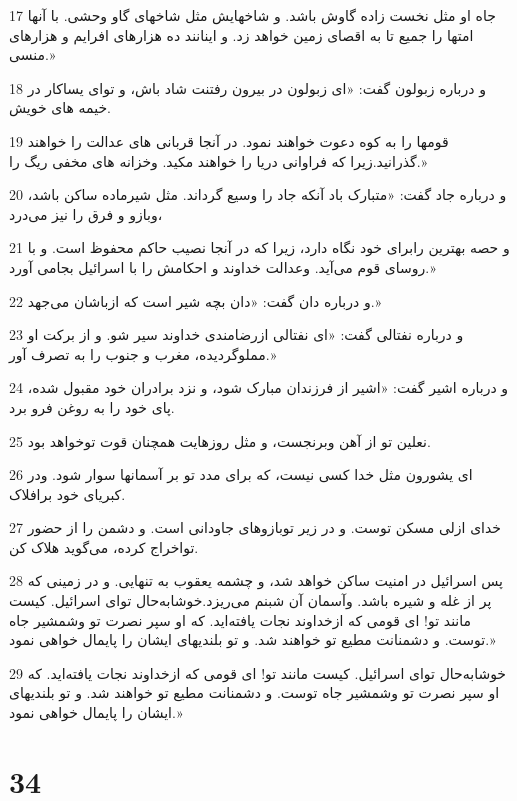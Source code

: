 \par 17 جاه او مثل نخست زاده گاوش باشد. و شاخهایش مثل شاخهای گاو وحشی. با آنها امتها را جمیع تا به اقصای زمین خواهد زد. و اینانند ده هزارهای افرایم و هزارهای منسی.»
\par 18 و درباره زبولون گفت: «ای زبولون در بیرون رفتنت شاد باش، و تو‌ای یساکار در خیمه های خویش.
\par 19 قومها را به کوه دعوت خواهند نمود. در آنجا قربانی های عدالت را خواهند گذرانید.زیرا که فراوانی دریا را خواهند مکید. وخزانه های مخفی ریگ را.»
\par 20 و درباره جاد گفت: «متبارک باد آنکه جاد را وسیع گرداند. مثل شیرماده ساکن باشد، وبازو و فرق را نیز می‌درد، 
\par 21 و حصه بهترین رابرای خود نگاه دارد، زیرا که در آنجا نصیب حاکم محفوظ است. و با روسای قوم می‌آید. وعدالت خداوند و احکامش را با اسرائیل بجامی آورد.»
\par 22 و درباره دان گفت: «دان بچه شیر است که ازباشان می‌جهد.»
\par 23 و درباره نفتالی گفت: «ای نفتالی ازرضامندی خداوند سیر شو. و از برکت او مملوگردیده، مغرب و جنوب را به تصرف آور.»
\par 24 و درباره اشیر گفت: «اشیر از فرزندان مبارک شود، و نزد برادران خود مقبول شده، پای خود را به روغن فرو برد.
\par 25 نعلین تو از آهن وبرنجست، و مثل روزهایت همچنان قوت توخواهد بود.
\par 26 ‌ای یشورون مثل خدا کسی نیست، که برای مدد تو بر آسمانها سوار شود. ودر کبریای خود برافلاک.
\par 27 خدای ازلی مسکن توست. و در زیر توبازوهای جاودانی است. و دشمن را از حضور تواخراج کرده، می‌گوید هلاک کن.
\par 28 پس اسرائیل در امنیت ساکن خواهد شد، و چشمه یعقوب به تنهایی. و در زمینی که پر از غله و شیره باشد. وآسمان آن شبنم می‌ریزد.خوشابه‌حال تو‌ای اسرائیل. کیست مانند تو! ای قومی که ازخداوند نجات یافته‌اید. که او سپر نصرت تو وشمشیر جاه توست. و دشمنانت مطیع تو خواهند شد. و تو بلندیهای ایشان را پایمال خواهی نمود.»
\par 29 خوشابه‌حال تو‌ای اسرائیل. کیست مانند تو! ای قومی که ازخداوند نجات یافته‌اید. که او سپر نصرت تو وشمشیر جاه توست. و دشمنانت مطیع تو خواهند شد. و تو بلندیهای ایشان را پایمال خواهی نمود.»
 
\chapter{34}

